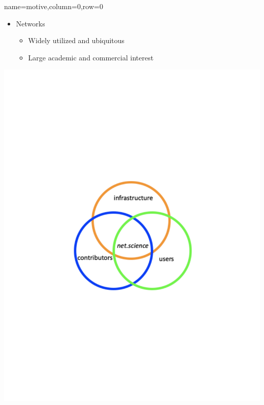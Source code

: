 \documentclass[landscape,paperwidth=70in,paperheight=46in,fontscale=0.225]{baposter} %
\begin{document}
\begin{poster}
          {name=motive,column=0,row=0}{
{\small
\begin{minipage}{.73\textwidth}
\begin{itemize}[leftmargin=*,noitemsep,topsep=0pt]
\item Networks
	\begin{itemize}
	\item Widely utilized and ubiquitous
	\item Large academic and commercial interest
	\end{itemize}
\end{itemize}
 \end{minipage}       
\begin{minipage}{.22\textwidth}
\includegraphics[scale=0.23]{figures/motivation.pdf}
\end{minipage}

}}
\end{poster}
\end{document}
